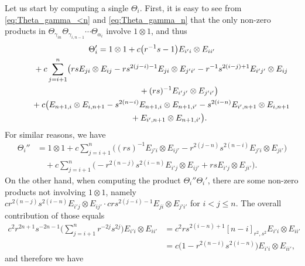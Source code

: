 \documentclass[10pt,a4paper]{amsart}
\numberwithin{equation}{section}
\begin{document}
Let us start by computing a single $\Theta_{i}$. First, it is easy to see from \eqref{eq:Theta_gamma_<n} and \eqref{eq:Theta_gamma_n} that the only non-zero products in $\Theta_{\gamma_{in}}\Theta_{\gamma_{i,n-1}}\cdots \Theta_{\alpha_{i}}$ involve $1 \otimes 1$, and thus
\begin{gather*}
 \Theta_{i}' = 1 \otimes 1 + c\bigl(r^{-1}s-1\bigr)E_{i'i} \otimes E_{ii'} \\
 \hphantom{\Theta_{i}' =}{}
 + c\sum_{j = i + 1}^{n}\bigl(rsE_{ji} \otimes E_{ij} - rs^{2(j - i) - 1}E_{ji} \otimes E_{j'i'} - r^{-1}s^{2(i-j) + 1}E_{i'j'} \otimes E_{ij}
 \\
 \hphantom{\Theta_{i}' =+ c\sum_{j = i + 1}^{n}\bigl(}{}
 + (rs)^{-1}E_{i'j'} \otimes E_{j'i'}\bigr) \\
 \hphantom{\Theta_{i}' =}{}
 + c\bigl(E_{n + 1,i} \otimes E_{i,n+1} - s^{2(n - i)}E_{n + 1,i} \otimes E_{n+1, i'} - s^{2(i - n)}E_{i',n + 1} \otimes E_{i,n + 1} \\
 \hphantom{\Theta_{i}' =+ c\bigl(}{}
 + E_{i',n + 1} \otimes E_{n + 1,i'} \bigr).
\end{gather*}
For similar reasons, we have
\begin{align*}
 \Theta_{i}'' &{}= 1 \otimes 1 + c\sum_{j = i + 1}^{n}\bigl((rs)^{-1}E_{j'i} \otimes E_{ij'} - r^{2(j - n)}s^{2(n - i)}E_{j'i} \otimes E_{ji'}\bigr) \\
 &\quad{} +c\sum_{j = i + 1}^{n}\bigl(- r^{2(n - j)}s^{2(i - n)}E_{i'j} \otimes E_{ij'} + rsE_{i'j} \otimes E_{ji'} \bigr).
\end{align*}
On the other hand, when computing the product $\Theta_{i}''\Theta_{i}'$, there are some non-zero products not involving $1 \otimes 1$, namely $cr^{2(n - j)}s^{2(i - n)}E_{i'j} \otimes E_{ij'} \cdot crs^{2(j - i) - 1}E_{ji} \otimes E_{j'i'}$ for $i < j \le n$. The overall contribution of those equals
\begin{displaymath}
\begin{split}
 c^{2}r^{2n + 1}s^{-2n - 1}\Biggl(\sum_{j = i + 1}^{n}r^{-2j}s^{2j} \Biggr)E_{i'i} \otimes E_{ii'} &= c^{2}rs^{2(i - n) + 1}[n - i]_{r^{2},s^{2}} E_{i'i} \otimes E_{ii'} \\
 & = c\bigl(1-r^{2(n - i)}s^{2(i - n)} \bigr)E_{i'i} \otimes E_{ii'},
\end{split}
\end{displaymath}
and therefore we have
\end{document}
